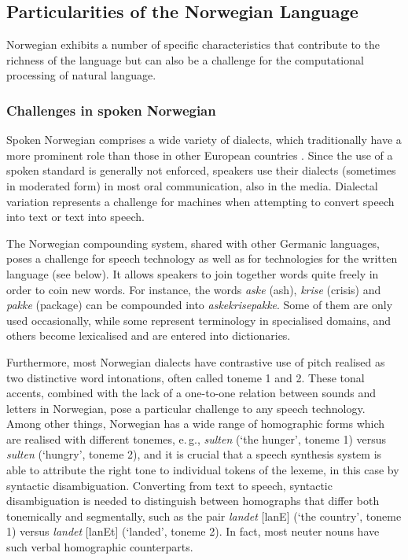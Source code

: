\begin{multicols}{2}
\subsection{Particularities of the Norwegian Language}

Norwegian exhibits a number of specific characteristics that contribute to the richness of the language but can also be a challenge for the computational processing of natural language. 

\subsubsection{Challenges in spoken Norwegian}
Spoken Norwegian comprises a wide variety of dialects, which traditionally have a more prominent role than those in other European countries \cite{stm35:2008}.
Since the use of a spoken standard is generally not enforced, speakers use their dialects (sometimes in moderated form) in most oral communication, also in the media.
Dialectal variation represents a challenge for machines when attempting to convert speech into text or text into speech.


The Norwegian compounding system, shared with other Germanic languages, poses a challenge for speech technology as well as for technologies for the written language (see below). 
It allows speakers to join together words quite freely in order to coin new words. 
For instance, the words \textit{aske} (ash), \textit{krise} (crisis) and \textit{pakke} (package) can be compounded into \textit{askekrisepakke}. 
Some of them are only used occasionally, while some represent terminology in specialised domains, and others become lexicalised and are entered into dictionaries. 

Furthermore, most Norwegian dialects have contrastive use of pitch realised as two distinctive word intonations, often called toneme 1 and 2. 
These tonal accents, combined with the lack of a one-to-one relation between sounds and letters in Norwegian, pose a particular challenge to any speech technology. 
Among other things, Norwegian has a wide range of homographic forms
which are realised with different tonemes, e.\,g., \textit{sulten} (‘the hunger’, toneme 1) versus \textit{sulten} (‘hungry’, toneme 2), and it is crucial that a speech synthesis system is able to attribute the right tone to individual tokens of the lexeme, in this case by syntactic disambiguation. 
Converting from text to speech, syntactic disambiguation is needed to distinguish between homographs that differ both tonemically and segmentally, such as the pair \textit{landet} {[}lanE{]} (`the country', toneme 1) versus \textit{landet} {[}lanEt{]} (`landed', toneme 2). 
In fact, most neuter nouns have such verbal homographic counterparts.


\end{multicols}
